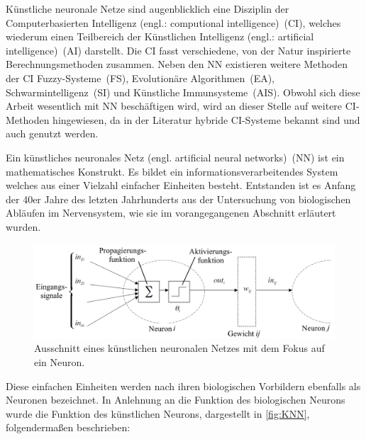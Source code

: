 
Künstliche neuronale Netze sind augenblicklich eine Disziplin der Computerbasierten Intelligenz (engl.: computional intelligence)~(CI), welches wiederum einen Teilbereich der Künstlichen Intelligenz (engl.: artificial intelligence)~(AI) darstellt. Die CI fasst verschiedene, von der Natur inspirierte Berechnungsmethoden zusammen. Neben den NN existieren weitere Methoden der CI Fuzzy-Systeme~(FS), Evolutionäre Algorithmen~(EA), Schwarmintelligenz~(SI) und Künstliche Immunsysteme~(AIS). Obwohl sich diese Arbeit wesentlich mit NN beschäftigen wird, wird an dieser Stelle auf weitere CI-Methoden hingewiesen, da in der Literatur hybride CI-Systeme bekannt sind und auch genutzt werden.

Ein künstliches neuronales Netz (engl. artificial neural networks)~(NN) ist ein mathematisches Konstrukt. Es bildet ein informationsverarbeitendes System welches aus einer Vielzahl einfacher Einheiten besteht. Entstanden ist es Anfang der 40er Jahre des letzten Jahrhunderts aus der Untersuchung von biologischen Abläufen im Nervensystem, wie sie im vorangegangenen Abschnitt erläutert wurden. 

\begin{figure}[!htb]
    \centering
        \includegraphics[width=1\textwidth]{Bilder/misc/kuenstliches_neuron.png}
    \caption{Ausschnitt eines künstlichen neuronalen Netzes mit dem Fokus auf ein Neuron.\protect\footnotemark{}}
    \label{fig:KNN}
\end{figure}

\addtocounter{footnote}{-1}     %
\addtocounter{Hfootnote}{-1}    %
\wrapfigfoot{}


Diese einfachen Einheiten werden nach ihren biologischen Vorbildern ebenfalls als Neuronen bezeichnet. In Anlehnung an die Funktion des biologischen Neurons wurde die Funktion des künstlichen Neurons, dargestellt in \autoref{fig:KNN}, folgendermaßen beschrieben:

